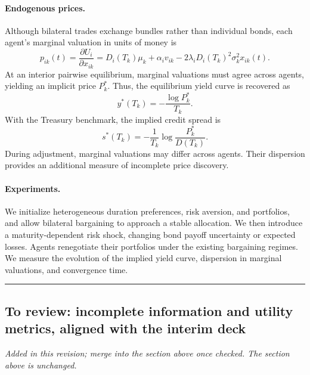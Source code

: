 \paragraph{Endogenous prices.}
Although bilateral trades exchange bundles rather than individual bonds, each agent's marginal valuation in units of money is
\[
p_{ik}(t)=\frac{\partial U_i}{\partial x_{ik}}
=D_i(T_k)\mu_k+\alpha_i v_{ik}
-2\lambda_iD_i(T_k)^2\sigma_k^2x_{ik}(t).
\]
At an interior pairwise equilibrium, marginal valuations must agree across agents, yielding an implicit price $P_k^*$. Thus, the equilibrium yield curve is recovered as
\[
y^*(T_k)=-\frac{\log P_k^*}{T_k}.
\]
With the Treasury benchmark, the implied credit spread is
\[
s^*(T_k)=-\frac{1}{T_k}\log\frac{P_k^*}{D(T_k)}.
\]
During adjustment, marginal valuations may differ across agents. Their dispersion provides an additional measure of incomplete price discovery.

\paragraph{Experiments.}
We initialize heterogeneous duration preferences, risk aversion, and portfolios, and allow bilateral bargaining to approach a stable allocation. We then introduce a maturity-dependent risk shock, changing bond payoff uncertainty or expected losses. Agents renegotiate their portfolios under the existing bargaining regimes. We measure the evolution of the implied yield curve, dispersion in marginal valuations, and convergence time.


\bigskip
\noindent\rule{\linewidth}{0.6pt}
\subsection*{To review: incomplete information and utility metrics, aligned with the interim deck}
\noindent\textit{Added in this revision; merge into the section above once checked. The section above is unchanged.}
\smallskip

